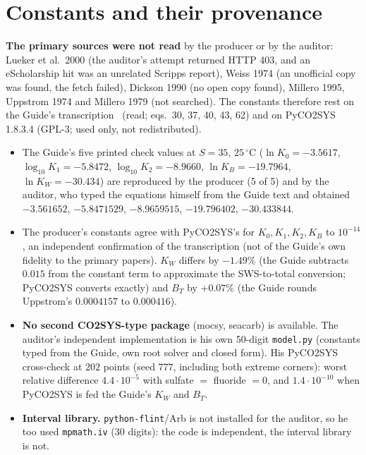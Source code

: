 \documentclass[10pt]{article}
\begin{document}
\section{Constants and their provenance}\label{sec:const}
\textbf{The primary sources were not read} by the producer or by the auditor: Lueker et al.\ 2000 (the auditor's attempt returned HTTP 403, and an eScholarship hit was an unrelated Scripps report), Weiss 1974 (an unofficial copy was found, the fetch failed), Dickson 1990 (no open copy found), Millero 1995, Uppstrom 1974 and Millero 1979 (not searched). The constants therefore rest on the Guide's transcription~\cite{guide} (read; eqs.\ 30, 37, 40, 43, 62) and on PyCO2SYS 1.8.3.4 (GPL-3; used only, not redistributed).
\begin{itemize}\itemsep=1pt
\item The Guide's five printed check values at $S=35$, $25\,^\circ$C ($\ln K_0=-3.5617$, $\log_{10}K_1=-5.8472$, $\log_{10}K_2=-8.9660$, $\ln K_B=-19.7964$, $\ln K_W=-30.434$) are reproduced by the producer (5 of 5) and by the auditor, who typed the equations himself from the Guide text and obtained $-3.561652$, $-5.8471529$, $-8.9659515$, $-19.796402$, $-30.433844$.
\item The producer's constants agree with PyCO2SYS's for $K_0,K_1,K_2,K_B$ to $10^{-14}$, an independent confirmation of the transcription (not of the Guide's own fidelity to the primary papers). $K_W$ differs by $-1.49\%$ (the Guide subtracts $0.015$ from the constant term to approximate the SWS-to-total conversion; PyCO2SYS converts exactly) and $B_T$ by $+0.07\%$ (the Guide rounds Uppstrom's $0.0004157$ to $0.000416$).
\item \textbf{No second CO2SYS-type package} (mocsy, seacarb) is available. The auditor's independent implementation is his own 50-digit \texttt{model.py} (constants typed from the Guide, own root solver and closed form). His PyCO2SYS cross-check at $202$ points (seed $777$, including both extreme corners): worst relative difference $4.4\cdot10^{-5}$ with sulfate $=$ fluoride $=0$, and $1.4\cdot10^{-10}$ when PyCO2SYS is fed the Guide's $K_W$ and $B_T$.
\item \textbf{Interval library.} \texttt{python-flint}/Arb is not installed for the auditor, so he too used \texttt{mpmath.iv} (30 digits): the code is independent, the interval library is not.
\end{itemize}

\end{document}
